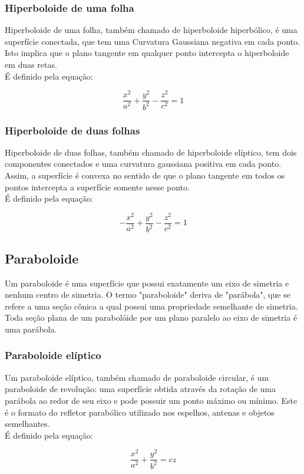\documentclass[12 pt, a4 paper]{article}
\begin{document}
\subsubsection{Hiperboloide de uma folha}
Hiperboloide de uma folha, também chamado de hiperboloide hiperbólico, é uma superfície conectada, que tem uma Curvatura Gaussiana negativa em cada ponto. Isto implica que o plano tangente em qualquer ponto intercepta o hiperboloide em duas retas.
\\
É definido pela equação:
\begin{center}

\begin{equation}
\dfrac{x^2}{a^2} + \dfrac{y^2}{b^2} - \dfrac{z^2}{c^2} = 1
\end{equation}

\end{center}

\subsubsection{Hiperboloide de duas folhas}
Hiperboloide de duas folhas, também chamado de hiperboloide elíptico, tem dois componentes conectados e uma curvatura gaussiana positiva em cada ponto. Assim, a superfície é convexa no sentido de que o plano tangente em todos os pontos intercepta a superfície somente nesse ponto.
\\
É definido pela equação:
\begin{center}

\begin{equation}
-\dfrac{x^2}{a^2} + \dfrac{y^2}{b^2} - \dfrac{z^2}{c^2} = 1
\end{equation}

\end{center}

\subsection{Paraboloide}
Um paraboloide é uma superfície que possui exatamente um eixo de simetria e nenhum centro de simetria. O termo "paraboloide" deriva de "parábola", que se refere a uma seção cônica a qual possui uma propriedade semelhante de simetria. Toda seção plana de um parabolóide por um plano paralelo ao eixo de simetria é uma parábola.

\subsubsection{Paraboloide elíptico}
Um paraboloide elíptico, também chamado de paraboloide circular, é um paraboloide de revolução: uma superfície obtida através da rotação de uma parábola ao redor de seu eixo e pode possuir um ponto máximo ou mínimo. Este é o formato do refletor parabólico utilizado nos espelhos, antenas e objetos semelhantes.
\\É definido pela equação:
\begin{center}

\begin{equation}
\dfrac{x^2}{a^2} + \dfrac{y^2}{b^2} = cz
\end{equation}

\end{center}
\end{document}
